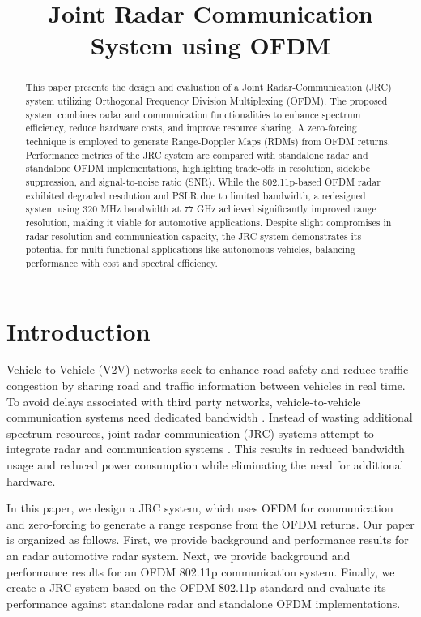 \documentclass[conference]{IEEEtran}
\title{Joint Radar Communication System using OFDM}
\author{

\IEEEauthorblockN{Owen Sowatzke}
\IEEEauthorblockA{\textit{Electrical Engineering Department} \\
\textit{University of Arizona}\\
Tucson, USA \\
osowatzke@arizona.edu}

\and
\IEEEauthorblockN{Iman Miraki}
\IEEEauthorblockA{\textit{Electrical Engineering Department} \\
\textit{University of Arizona}\\
Tucson, USA \\
imanmiraki@arizona.edu}}
\begin{document}
	\raggedbottom
	\maketitle
	
\begin {abstract}


This paper presents the design and evaluation of a Joint Radar-Communication (JRC) system utilizing Orthogonal Frequency Division Multiplexing (OFDM). The proposed system combines radar and communication functionalities to enhance spectrum efficiency, reduce hardware costs, and improve resource sharing. A zero-forcing technique is employed to generate Range-Doppler Maps (RDMs) from OFDM returns. Performance metrics of the JRC system are compared with standalone radar and standalone OFDM implementations, highlighting trade-offs in resolution, sidelobe suppression, and signal-to-noise ratio (SNR). While the 802.11p-based OFDM radar exhibited degraded resolution and PSLR due to limited bandwidth, a redesigned system using 320 MHz bandwidth at 77 GHz achieved significantly improved range resolution, making it viable for automotive applications. Despite slight compromises in radar resolution and communication capacity, the JRC system demonstrates its potential for multi-functional applications like autonomous vehicles, balancing performance with cost and spectral efficiency.
\end{abstract}

\section {Introduction}
     Vehicle-to-Vehicle (V2V) networks seek to enhance road safety and reduce traffic congestion by sharing road and traffic information between vehicles in real time. To avoid delays associated with third party networks, vehicle-to-vehicle communication systems need dedicated bandwidth \cite{8500189}. Instead of wasting additional spectrum resources, joint radar communication (JRC) systems attempt to integrate radar and communication systems \cite{8972666}. This results in reduced bandwidth usage and reduced power consumption while eliminating the need for additional hardware.
     
     In this paper, we design a JRC system, which uses OFDM for communication and zero-forcing to generate a range response from the OFDM returns. Our paper is organized as follows. First, we provide background and performance results for an radar automotive radar system. Next, we provide background and performance results for an OFDM 802.11p communication system. Finally, we create a JRC system based on the OFDM 802.11p standard and evaluate its performance against standalone radar and standalone OFDM implementations.
        
\end{document}
